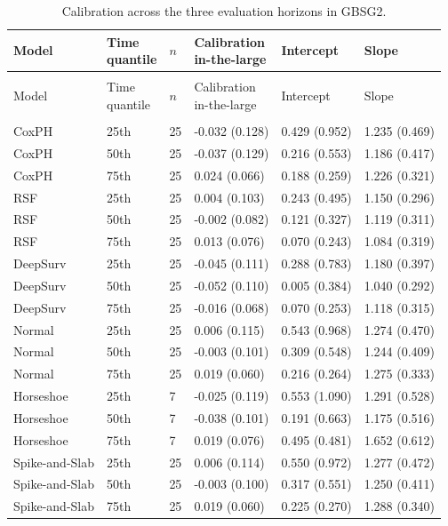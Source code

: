 \clearpage\begingroup\singlespacing\footnotesize
\setlength{\LTpre}{6pt}\setlength{\LTpost}{6pt}
\begin{longtable}{@{}>{\raggedright\arraybackslash}p{3.1cm}>{\raggedright\arraybackslash}p{1.3cm}p{0.5cm}p{2.9cm}p{2.9cm}p{2.9cm}@{}}
\caption{Calibration across the three evaluation horizons in GBSG2.}\label{tab:calibration-all-gbsg2}\\
\toprule Model & \shortstack[l]{Time\\quantile} & $n$ & \shortstack[l]{Calibration\\in-the-large} & Intercept & Slope \\\midrule\endfirsthead
\multicolumn{6}{l}{\tablename\ \thetable\ (continued)}\\
\toprule Model & \shortstack[l]{Time\\quantile} & $n$ & \shortstack[l]{Calibration\\in-the-large} & Intercept & Slope \\\midrule\endhead
\midrule\multicolumn{6}{r}{Continued on next page}\\\endfoot
\bottomrule\endlastfoot
CoxPH & 25th & 25 & -0.032 (0.128) & 0.429 (0.952) & 1.235 (0.469) \\
CoxPH & 50th & 25 & -0.037 (0.129) & 0.216 (0.553) & 1.186 (0.417) \\
CoxPH & 75th & 25 & 0.024 (0.066) & 0.188 (0.259) & 1.226 (0.321) \\
RSF & 25th & 25 & 0.004 (0.103) & 0.243 (0.495) & 1.150 (0.296) \\
RSF & 50th & 25 & -0.002 (0.082) & 0.121 (0.327) & 1.119 (0.311) \\
RSF & 75th & 25 & 0.013 (0.076) & 0.070 (0.243) & 1.084 (0.319) \\
DeepSurv & 25th & 25 & -0.045 (0.111) & 0.288 (0.783) & 1.180 (0.397) \\
DeepSurv & 50th & 25 & -0.052 (0.110) & 0.005 (0.384) & 1.040 (0.292) \\
DeepSurv & 75th & 25 & -0.016 (0.068) & 0.070 (0.253) & 1.118 (0.315) \\
Normal & 25th & 25 & 0.006 (0.115) & 0.543 (0.968) & 1.274 (0.470) \\
Normal & 50th & 25 & -0.003 (0.101) & 0.309 (0.548) & 1.244 (0.409) \\
Normal & 75th & 25 & 0.019 (0.060) & 0.216 (0.264) & 1.275 (0.333) \\
Horseshoe & 25th & 7 & -0.025 (0.119) & 0.553 (1.090) & 1.291 (0.528) \\
Horseshoe & 50th & 7 & -0.038 (0.101) & 0.191 (0.663) & 1.175 (0.516) \\
Horseshoe & 75th & 7 & 0.019 (0.076) & 0.495 (0.481) & 1.652 (0.612) \\
Spike-and-Slab & 25th & 25 & 0.006 (0.114) & 0.550 (0.972) & 1.277 (0.472) \\
Spike-and-Slab & 50th & 25 & -0.003 (0.100) & 0.317 (0.551) & 1.250 (0.411) \\
Spike-and-Slab & 75th & 25 & 0.019 (0.060) & 0.225 (0.270) & 1.288 (0.340) \\
\end{longtable}
